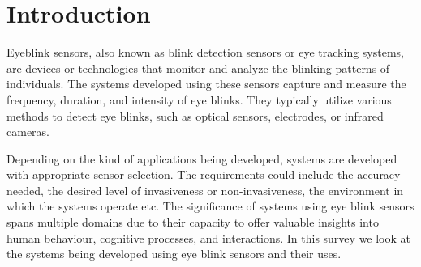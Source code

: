 \documentclass[conference]{IEEEtran}
\begin{document}
\section{Introduction}
Eyeblink sensors, also known as blink detection sensors or eye tracking systems, are devices or technologies that monitor and analyze the blinking patterns of individuals. The systems developed using these sensors capture and measure the frequency, duration, and intensity of eye blinks. They typically utilize various methods to detect eye blinks, such as optical sensors, electrodes, or infrared cameras.

Depending on the kind of applications being developed, systems are developed with appropriate sensor selection. The requirements could include the accuracy needed, the desired level of invasiveness or non-invasiveness, the environment in which the systems operate etc.
The significance of systems using eye blink sensors spans multiple domains due to their capacity to offer valuable insights into human behaviour, cognitive processes, and interactions. In this survey we look at the systems being developed using eye blink sensors and their uses.
\end{document}
